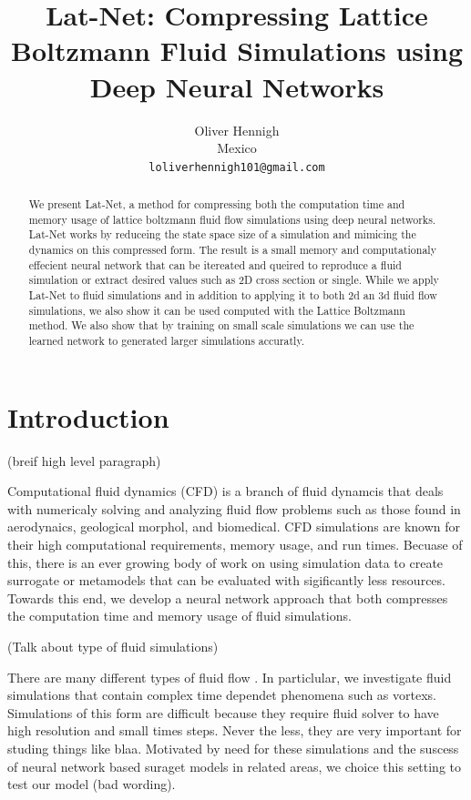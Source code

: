 \documentclass{article}
\title{Lat-Net: Compressing Lattice Boltzmann Fluid Simulations using Deep Neural Networks}
\author{
  Oliver Hennigh \\
  Mexico \\
  \texttt{loliverhennigh101@gmail.com} \\
}
\begin{document}

\maketitle

\begin{abstract}
We present Lat-Net, a method for compressing both the computation time and memory usage of lattice boltzmann fluid flow simulations using deep neural networks. Lat-Net works by reduceing the state space size of a simulation and mimicing the dynamics on this compressed form. The result is a small memory and computationaly effecient neural network that can be itereated and queired to reproduce a fluid simulation or extract desired values such as 2D cross section or single. While we apply Lat-Net to fluid simulations   and in addition to applying it to both 2d an 3d fluid flow simulations, we also show it can be used  computed with the Lattice Boltzmann method. We also show that by training on small scale simulations we can use the learned network to generated larger simulations accuratly.

\end{abstract}

\section{Introduction}

(breif high level paragraph)

Computational fluid dynamics (CFD) is a branch of fluid dynamcis that deals with numericaly solving and analyzing fluid flow problems such as those found in aerodynaics, geological morphol, and biomedical. CFD simulations are known for their high computational requirements, memory usage, and run times. Becuase of this, there is an ever growing body of work on using simulation data to create surrogate or metamodels that can be evaluated with sigificantly less resources. Towards this end, we develop a neural network approach that both compresses the computation time and memory usage of fluid simulations.

(Talk about type of fluid simulations)

There are many different types of fluid flow . In particlular, we investigate fluid simulations that contain complex time dependet phenomena such as vortexs. Simulations of this form are difficult because they require fluid solver to have high resolution and small times steps. Never the less, they are very important for studing things like blaa. Motivated by need for these simulations and the suscess of neural network based suraget models in related areas, we choice this setting to test our model (bad wording).
\end{document}
